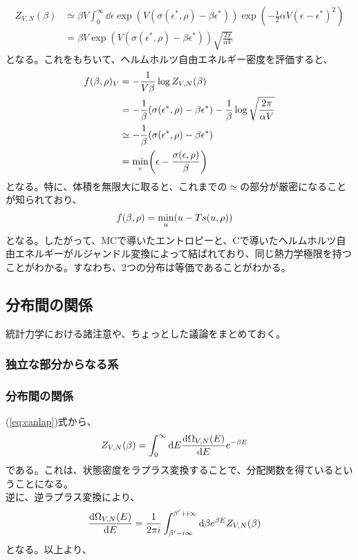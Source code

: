 \documentclass[a4paper,11pt]{jsarticle}
\numberwithin{equation}{section}
\begin{document}
\begin{align}
  Z_{V,N}(\beta) &\simeq \beta V \int_{0}^{\infty}\dd \epsilon \exp(V(\sigma(\epsilon^{*},\rho)-\beta \epsilon^{*})) \exp(-\frac{1}{2}\alpha V(\epsilon-\epsilon^{*})^2)\\
  &= \beta V \exp(V(\sigma(\epsilon^{*},\rho)-\beta \epsilon^{*}))\sqrt{\frac{2\pi}{\alpha V}}
\end{align}
となる。これをもちいて、ヘルムホルツ自由エネルギー密度を評価すると、
\begin{align}
  f(\beta,\rho)_V &= -\frac{1}{V\beta}\log Z_{V,N}(\beta)\\
  &= -\frac{1}{\beta}(\sigma(\epsilon^{*},\rho) -\beta \epsilon^{*} ) -\frac{1}{\beta}\log \sqrt{\frac{2\pi}{\alpha V}}\\
  &\simeq -\frac{1}{\beta}(\sigma(\epsilon^{*},\rho) -\beta \epsilon^{*} ) \\
  &= \underset{\epsilon}{\min} \qty(\epsilon - \frac{\sigma(\epsilon,\rho)}{\beta})
\end{align}
となる。特に、体積を無限大に取ると、これまでの$\simeq$の部分が厳密になることが知られており、
\begin{align}
  f(\beta,\rho) &= \underset{u}{\min} \qty(u - Ts(u,\rho))
\end{align}
となる。したがって、MCで導いたエントロピーと、Cで導いたヘルムホルツ自由エネルギーがルジャンドル変換によって結ばれており、同じ熱力学極限を持つことがわかる。すなわち、2つの分布は等価であることがわかる。\hfill\qedsymbol\\






\subsection{分布間の関係}
統計力学における諸注意や、ちょっとした議論をまとめておく。\\

\subsubsection{独立な部分からなる系}

\subsubsection{分布間の関係}
(\ref{eq:canlap})式から、
\begin{align}
  Z_{V,N}(\beta) &= \int_{0}^{\infty}\dd E \dv{\Omega_{V,N}(E)}{E}e^{-\beta E}
\end{align}
である。これは、状態密度をラプラス変換することで、分配関数を得ているということになる。\\
逆に、逆ラプラス変換により、
\begin{align}
  \dv{\Omega_{V,N}(E)}{E} &= \frac{1}{2\pi i}\int_{\beta' - i\infty}^{\beta' + i\infty}\dd \beta e^{\beta E}Z_{V,N}(\beta)
\end{align}
となる。以上より、
\end{document}
